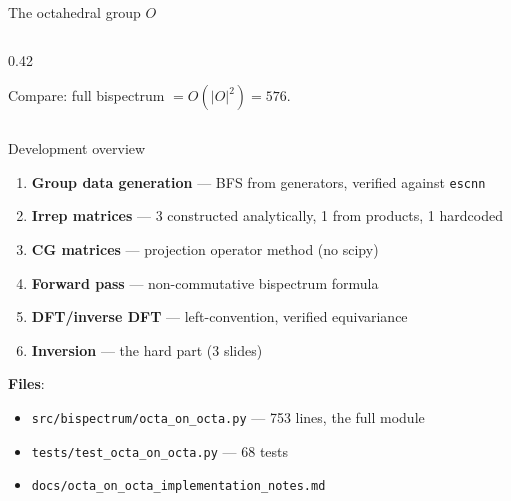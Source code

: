 \documentclass[aspectratio=169]{beamer}
\begin{document}
\begin{frame}{The octahedral group $O$}
\begin{columns}[T]
\begin{column}{0.42\textwidth}
      \bigskip

      Compare: full bispectrum $= O(|O|^2) = 576$.
    \end{column}
  \end{columns}
\end{frame}

\begin{frame}{Development overview}
  \begin{enumerate}
    \item \textbf{Group data generation} --- BFS from generators, verified against \texttt{escnn}
    \item \textbf{Irrep matrices} --- 3 constructed analytically, 1 from products, 1 hardcoded
    \item \textbf{CG matrices} --- projection operator method (no scipy)
    \item \textbf{Forward pass} --- non-commutative bispectrum formula
    \item \textbf{DFT/inverse DFT} --- left-convention, verified equivariance
    \item \textbf{Inversion} --- the hard part (3 slides)
  \end{enumerate}

  \bigskip

  \textbf{Files}:
  \begin{itemize}
    \item \texttt{src/bispectrum/octa\_on\_octa.py} --- 753 lines, the full module
    \item \texttt{tests/test\_octa\_on\_octa.py} --- 68 tests
    \item \texttt{docs/octa\_on\_octa\_implementation\_notes.md}
  \end{itemize}
\end{frame}
\end{document}
